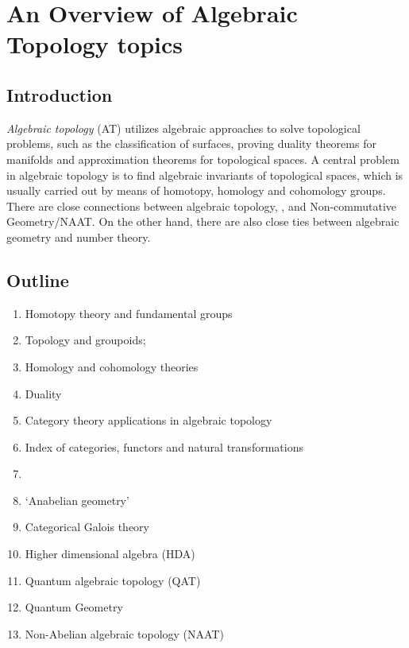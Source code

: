 \documentclass[12pt]{article}
\theoremstyle{plain}
\theoremstyle{definition}
\numberwithin{equation}{section}
\begin{document}
\section{An Overview of Algebraic Topology topics}


\subsection{Introduction}
\emph{Algebraic topology} (AT) utilizes algebraic approaches to solve topological problems,
such as the classification of surfaces, proving duality theorems for manifolds and 
approximation theorems for topological spaces. A central problem in algebraic topology 
is to find algebraic invariants of topological spaces, which is usually carried out by means
of homotopy, homology and cohomology groups. There are close connections between algebraic topology, 
, and Non-commutative Geometry/NAAT. On the other hand, there are also close ties between algebraic geometry and number theory. 


\subsection{Outline}
\begin{enumerate}

\item Homotopy theory and fundamental groups
\item Topology and groupoids;  
\item Homology and cohomology theories
\item Duality
\item Category theory applications in algebraic topology
\item Index of categories, functors and natural transformations
\item {}
\item `Anabelian geometry'
\item Categorical Galois theory
\item Higher dimensional algebra (HDA)
\item Quantum algebraic topology (QAT)
\item Quantum Geometry
\item Non-Abelian algebraic topology (NAAT)
\end{enumerate}
\end{document}
